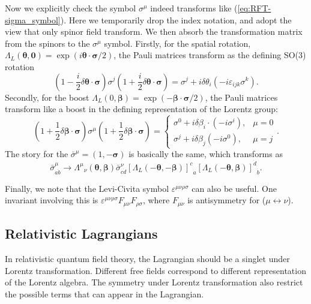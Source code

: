 \documentclass[aps,prb,superscriptaddress,nofootinbib]{revtex4}
\begin{document}
Now we explicitly check the symbol $\sigma^\mu$ indeed transforms like (\ref{eq:RFT-sigma_symbol}).
Here we temporarily drop the index notation, and adopt the view that only spinor field transform.
We then absorb the transformation matrix from the spinors to the $\sigma^\mu$ symbol.
Firstly, for the spatial rotation, $\Lambda_L(\bm\theta,\bm 0) = \exp(i\bm\theta\cdot \bm\sigma/2)$, the Pauli matrices transform as the defining SO(3) rotation
\begin{equation}
	\left(1-\frac{i}{2}\delta\bm\theta\cdot \bm\sigma \right)\sigma^j\left(1+\frac{i}{2}\delta\bm\theta\cdot \bm\sigma\right)
	= \sigma^j + i\delta\theta_i \left(-i \varepsilon_{ijk}\sigma^k \right).
\end{equation}
Secondly, for the boost $\Lambda_{L}(0, \bm\beta) = \exp\left(-\bm\beta\cdot \bm\sigma /2 \right)$, the Pauli matrices transform like a boost in the defining representation of the Lorentz group:
\begin{equation}
	\left(1+\frac{1}{2}\delta\bm\beta\cdot \bm\sigma\right) \sigma^\mu 
	\left(1+\frac{1}{2}\delta\bm\beta\cdot \bm\sigma\right) = \begin{cases}
		 \sigma^0 + i\delta\beta_i \cdot (-i\sigma^i), & \mu = 0 \\
		 \sigma^j + i\delta\beta_j (-i\sigma^0), & \mu = j
	\end{cases}.
\end{equation}
The story for the $\bar\sigma^\mu=(1,-\bm\sigma)$ is basically the same, which transforms as
\begin{equation}
	\bar\sigma^\mu_{a \dot b} \rightarrow
	{\Lambda^\mu}_\nu(\bm\theta,\bm\beta) \bar\sigma^\nu_{c \dot d}
	{\left[\Lambda_L(-\bm\theta, -\bm\beta)\right]^{c}}_{a} {\left[\Lambda_L(-\bm\theta, \bm\beta)\right]^{\dot d}}_{\dot b}.
\end{equation}

Finally, we note that the Levi-Civita symbol $\varepsilon^{\mu\nu\rho\sigma}$ can also be useful.
One invariant involving this is $\varepsilon^{\mu\nu\rho\sigma} F_{\mu\nu} F_{\rho\sigma}$, where $F_{\mu\nu}$ is antisymmetry for ($\mu \leftrightarrow \nu$).



\subsection{Relativistic Lagrangians}
In relativistic quantum field theory, the Lagrangian should be a singlet under Lorentz transformation.
Different free fields correspond to different representation of the Lorentz algebra.
The symmetry under Lorentz transformation also restrict the possible terms that can appear in the Lagrangian.
\end{document}
